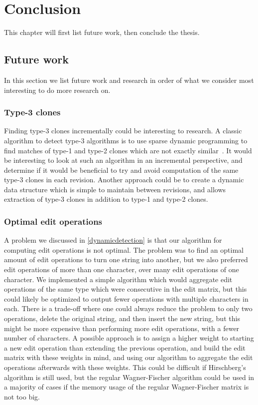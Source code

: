 \chapter{Conclusion}

This chapter will first list future work, then conclude the thesis.

\section{Future work}

In this section we list future work and research in order of what we consider most
interesting to do more research on.

\subsection*{Type-3 clones}

Finding type-3 clones incrementally could be interesting to research. A classic algorithm
to detect type-3 algorithms is to use sparse dynamic programming to find matches of type-1
and type-2 clones which are not exactly similar~\cite{BakerSparseDynamicProgramming}. It
would be interesting to look at such an algorithm in an incremental perspective, and
determine if it would be beneficial to try and avoid computation of the same type-3 clones
in each revision. Another approach could be to create a dynamic data structure which is
simple to maintain between revisions, and allows extraction of type-3 clones in addition
to type-1 and type-2 clones. 


\subsection*{Optimal edit operations}

A problem we discussed in \cref{dynamicdetection} is that our algorithm for computing edit
operations is not optimal. The problem was to find an optimal amount of edit operations to
turn one string into another, but we also preferred edit operations of more than one
character, over many edit operations of one character. We implemented a simple algorithm
which would aggregate edit operations of the same type which were consecutive in the edit
matrix, but this could likely be optimized to output fewer operations with multiple
characters in each. There is a trade-off where one could always reduce the problem to only
two operations, delete the original string, and then insert the new string, but this might
be more expensive than performing more edit operations, with a fewer number of characters.
A possible approach is to assign a higher weight to starting a new edit operation than
extending the previous operation, and build the edit matrix with these weights in mind,
and using our algorithm to aggregate the edit operations afterwards with these weights.
This could be difficult if Hirschberg's algorithm is still used, but the regular
Wagner-Fischer algorithm could be used in a majority of cases if the memory usage of the
regular Wagner-Fischer matrix is not too big.

